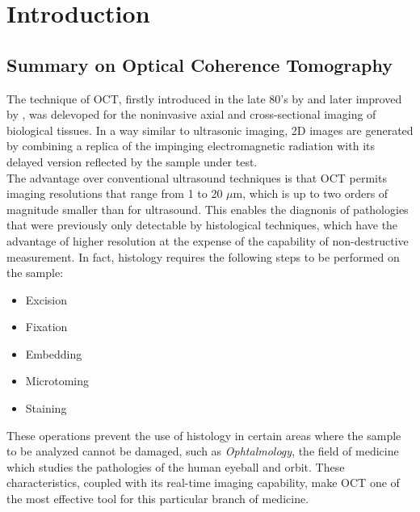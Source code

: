 
\chapter{Introduction} %
\label{ch:introduction} %

\section{Summary on Optical Coherence Tomography}
\label{sec:intro}

The technique of \acf{OCT}, firstly introduced in the late 80's by \citeauthor{Fujimoto1986} \cite{Fujimoto1986} and later improved by \citeauthor{Huang1991} \cite{Huang1991}, was delevoped for the noninvasive axial and cross-sectional imaging of biological tissues.
In a way similar to ultrasonic imaging, 2D images are generated by combining a replica of the impinging electromagnetic radiation with its delayed version reflected by the sample under test.\\



The advantage over conventional ultrasound techniques is that OCT permits imaging resolutions
that range from 1 to 20 $\mu$m, which is up to two orders of magnitude smaller than for ultrasound. This enables the diagnonis of pathologies that were previously only detectable by histological techniques, which have the advantage of higher resolution at the expense of the capability of non-destructive measurement. In fact, histology requires the following steps to be performed on the sample:
\begin{itemize}
    \item Excision
    \item Fixation
    \item Embedding
    \item Microtoming
    \item Staining
\end{itemize}

These operations prevent the use of histology in certain areas where the sample to be analyzed cannot be damaged, such as \emph{Ophtalmology}, the field of medicine which studies the pathologies of the human eyeball and orbit. These characteristics, coupled with its real-time imaging capability, make \ac{OCT} one of the most effective tool for this particular branch of medicine. 

